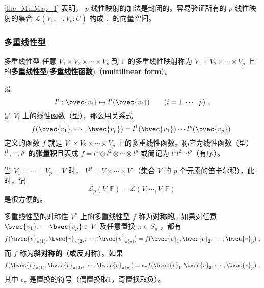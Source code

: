 \autoref{the_MulMap_1} 表明， $p$-线性映射的加法是封闭的。容易验证所有的 $p$-线性映射的集合 $\mathcal{L}(V_1,\cdots,V_p;U)$ 构成 $\mathbb{F}$ 的向量空间。
\subsubsection{多重线性型}
\begin{definition}{多重线性型}\label{def_MulMap_2}
任意 $V_1\times V_2\times\cdots\times V_p$ 到 $\mathbb{F}$ 的多重线性映射称为 $V_1\times V_2\times\cdots\times V_p$ 上的\textbf{多重线性型}(\textbf{多重线性函数})（\textbf{multilinear form}）。
\end{definition}
\begin{example}{}
设
\begin{equation}
l^i:\bvec{v_i}\mapsto l^i(\bvec{v_i})\qquad (i=1,\cdots,p)~.
\end{equation}
是 $V_i$ 上的线性函数（型），那么用关系式
\begin{equation}
f(\bvec{v_1},\cdots,\bvec{v_p})=l^1(\bvec{v_1})\cdots l^p(\bvec{v_p})~
\end{equation}
定义的函数 $f$ 就是 $V_1\times V_2\times\cdots\times V_p$ 上的多重线性函数。称它为线性函数（型）$l^1,\cdots,l^p$ 的\textbf{张量积}且表成 $f=l^1\otimes l^2\otimes\cdots\otimes l^p$ 或简记为 $l^1l^2\cdots l^p$（有序）。
\end{example}
当 $V_1=\cdots=V_p=V$ 时， $V^p=V\times\cdots\times V$ （集合 $V$ 的 $p$ 个元素的笛卡尔积），此时，记
\begin{equation}
\mathcal{L}_p(V,\mathbb{F})=\mathcal{L}(V,\cdots,V;\mathbb{F})~
\end{equation}
是很方便的。
\begin{definition}{多重线性型的对称性}\label{def_MulMap_1}
$V^p$ 上的多重线性型 $f$ 称为\textbf{对称的}。如果对任意 $\bvec{v_1},\cdots\bvec{v_p}\in V$ 及任意置换 $\pi\in S_p$ ，都有
\begin{equation}
f(\bvec{v}_{\pi(1)},\bvec{v}_{\pi(2)},\cdots,\bvec{v}_{\pi(p)})=f(\bvec{v}_1,\bvec{v}_2,\cdots,\bvec{v}_p)~,
\end{equation}
而 $f$ 称为\textbf{斜对称的}（或反对称）。如果
\begin{equation}
f(\bvec{v}_{\pi(1)},\bvec{v}_{\pi(2)},\cdots,\bvec{v}_{\pi(p)})=\epsilon_\pi f(\bvec{v}_1,\bvec{v}_2,\cdots,\bvec{v}_p)~,
\end{equation}
其中 $\epsilon_\pi$ 是置换的符号（偶置换取1，奇置换取负）。
\end{definition}
